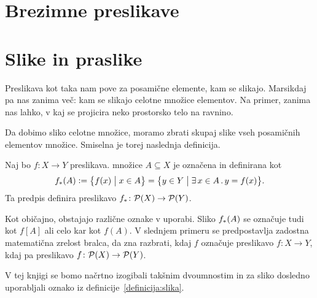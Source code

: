 


\section{Brezimne preslikave}\label{razdelek:brezimne-preslikave}




\section{Slike in praslike}

Preslikava kot taka nam pove za posamične elemente, kam se slikajo. Marsikdaj pa nas zanima več: kam se slikajo celotne množice elementov. Na primer, zanima nas lahko, v kaj se projicira neko prostorsko telo na ravnino.


Da dobimo sliko celotne množice, moramo zbrati skupaj slike vseh posamičnih elementov množice. Smiselna je torej naslednja definicija.

\begin{definicija}\label{definicija:slika}
Naj bo $f\colon X \to Y$ preslikava.  množice $A \subseteq X$ je označena in definirana kot
\[\img{f}{A} \dfeq \set[1]{f(x)}{x \in A} = \set[1]{y \in Y}{\xsome{x}[A]{y = f(x)}}.\]
Ta predpis definira preslikavo $\img{f}\colon \pst(X) \to \pst(Y)$.
\end{definicija}

\begin{opomba}
Kot običajno, obstajajo različne oznake v uporabi. Sliko $\img{f}{A}$ se označuje tudi kot $f[A]$ ali celo kar kot $f(A)$. V slednjem primeru se predpostavlja zadostna matematična zrelost bralca, da zna razbrati, kdaj $f$ označuje preslikavo $f\colon X \to Y$, kdaj pa preslikavo $f\colon \mathcal{P}(X) \to \mathcal{P}(Y)$.

V tej knjigi se bomo načrtno izogibali takšnim dvoumnostim in za sliko dosledno uporabljali oznako iz definicije~\ref{definicija:slika}.
\end{opomba}

